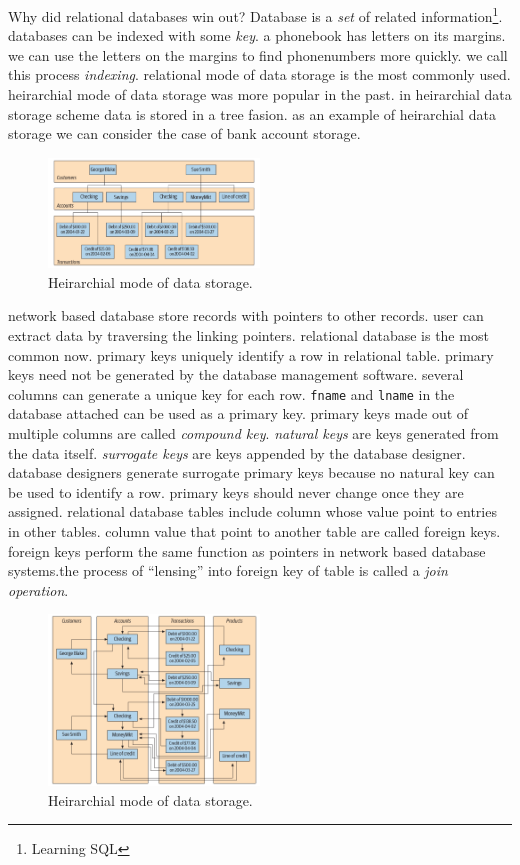 \documentclass[a4paper]{article}
\begin{document}
Why did relational databases win out? Database is a \emph{set} of related information\footnote{Learning SQL}. databases can
be indexed with some \emph{key}. a phonebook has letters on its margins. we can use the letters on the margins to find
phonenumbers more quickly. we call this process \emph{indexing}. relational mode of data storage is the most commonly used.
heirarchial mode of data storage was more popular in the past. in heirarchial data storage scheme data is stored in a tree 
fasion. as an example of heirarchial data storage we can consider the case of bank account storage.

\begin{figure}[hbt!]
    \centering
    \includegraphics[width=0.5\textwidth]{graphics/heirarchial-database.png}
    \caption{Heirarchial mode of data storage.}
\end{figure}

network based database store records with pointers to other records. user can extract data by traversing the linking pointers.
relational database is the most common now. primary keys uniquely identify a row in relational table. primary keys need not be
generated by the database management software. several columns can generate a unique key for each row. \lstinline{fname} and
\lstinline{lname} in the database attached can be used as a primary key. primary keys made out of multiple columns are called
\emph{compound key}. \emph{natural keys} are keys generated from the data itself. \emph{surrogate keys} are keys appended 
by the database designer. database designers generate surrogate primary keys because no natural key can be used to identify
a row. primary keys should never change once they are assigned. relational database tables include column whose value point
to entries in other tables. column value that point to another table are called foreign keys. foreign keys perform the same
function as pointers in network based database systems.the process of ``lensing'' into foreign key of table is called a
\emph{join operation}.

\begin{figure}[hbt!]
    \centering
    \includegraphics[width=0.5\textwidth]{graphics/network-database.png}
    \caption{Heirarchial mode of data storage.}
\end{figure}
\end{document}
